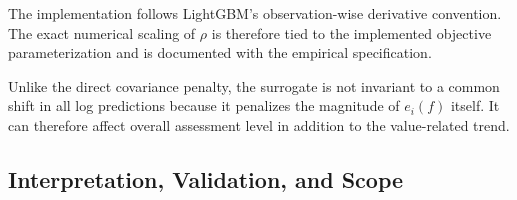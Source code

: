 \documentclass[10pt]{article}
\theoremstyle{definition}
\newcommand{\1}{\mathbf{1}}
\begin{document}
{{%

{The implementation follows LightGBM's observation-wise derivative convention. The exact numerical scaling of $\rho$ is therefore tied to the implemented objective parameterization and is documented with the empirical specification.}


{Unlike the direct covariance penalty, the surrogate is not invariant to a common shift in all log predictions because it penalizes the magnitude of $e_i(f)$ itself. It can therefore affect overall assessment level in addition to the value-related trend. %
}


\subsection{\textcolor{impGreen}{Interpretation, Validation, and Scope}}
\label{subsec:correction_scope}


}}
\end{document}
